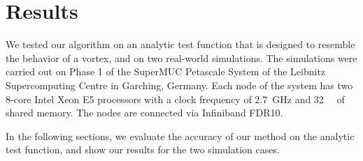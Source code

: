 \section{Results} %
\label{sec:fst_results}
%
We tested our algorithm on an analytic test function that is designed to
resemble the behavior of a vortex, and on two real-world simulations.
%
The simulations were carried out on Phase 1 of the SuperMUC Petascale System of
the Leibnitz Supercomputing Centre in Garching, Germany.
%
Each node of the system has two 8-core Intel Xeon E5 processors with a clock
frequency of \SI{2.7}{\giga\hertz} and \SI{32}{\giga\byte} of shared memory.
%
The nodes are connected via Infiniband FDR10.
%

%
In the following sections, we evaluate the accuracy of our method on the
analytic test function, and show our results for the two simulation cases.
%

%
